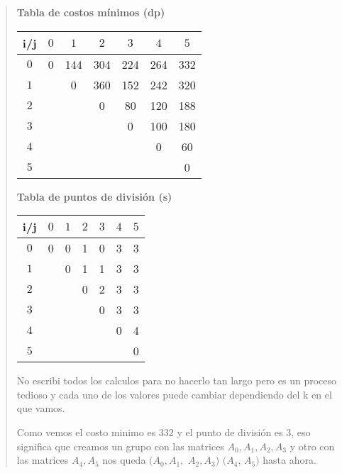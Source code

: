 \begin{quote}
    \begin{center}
        \noindent
        \textbf{Tabla de costos mínimos (dp)} \\
        \begin{tabular}{c|*{6}{c}}
        i/j & $0$ & $1$ & $2$ & $3$ & $4$ & $5$ \\
        \hline
        $0$ &  0  & 144 & 304 & 224 & 264 & 332 \\
        $1$ &     &  0  & 360 & 152 & 242 & 320 \\
        $2$ &     &     &  0  & 80  & 120 & 188 \\
        $3$ &     &     &     &  0  & 100 & 180 \\
        $4$ &     &     &     &     &  0  & 60  \\
        $5$ &     &     &     &     &     & 0   \\
        \end{tabular}

        \vspace{1cm}

        \noindent
        \textbf{Tabla de puntos de división (s)} \\
        \begin{tabular}{c|*{6}{c}}
        i/j & $0$ & $1$ & $2$ & $3$ & $4$ & $5$ \\
        \hline
        $0$ &  0  &  0  &  1  &  0  &  3  &  3  \\
        $1$ &     &  0  &  1  &  1  &  3  &  3  \\
        $2$ &     &     &  0  &  2  &  3  &  3  \\
        $3$ &     &     &     & 0   &  3  &  3  \\
        $4$ &     &     &     &     &  0  &  4  \\
        $5$ &     &     &     &     &     &  0  \\
        \end{tabular}
    \end{center}

    No escribi todos los calculos para no hacerlo tan largo pero es un proceso tedioso y cada uno de los valores puede cambiar dependiendo del k en el que vamos. \vspace{.2cm}

    Como vemos el costo minimo es 332 y el punto de división es 3, eso significa que creamos un grupo con las matrices $A_0, A_1, A_2,A_3$ y otro con las matrices $A_4, A_5$ nos queda $(A_0, A_1,$ $ A_2,A_3)$ $(A_4$, $ A_5)$ hasta ahora. \vspace{.2cm} 


\end{quote}
